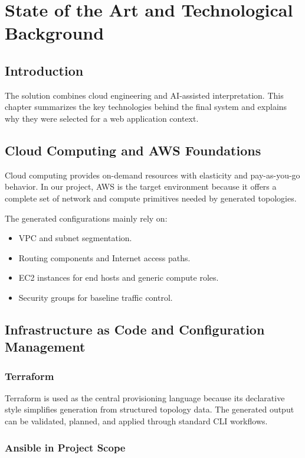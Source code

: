 \documentclass[12pt,a4paper,openany]{report}
\begin{document}
\chapter{State of the Art and Technological Background}

\section{Introduction}

The solution combines cloud engineering and AI-assisted interpretation. This chapter summarizes the key technologies behind the final system and explains why they were selected for a web application context.

\section{Cloud Computing and AWS Foundations}

Cloud computing provides on-demand resources with elasticity and pay-as-you-go behavior. In our project, AWS is the target environment because it offers a complete set of network and compute primitives needed by generated topologies.

The generated configurations mainly rely on:
\begin{itemize}
    \item VPC and subnet segmentation.
    \item Routing components and Internet access paths.
    \item EC2 instances for end hosts and generic compute roles.
    \item Security groups for baseline traffic control.
\end{itemize}

\section{Infrastructure as Code and Configuration Management}

\subsection{Terraform}

Terraform is used as the central provisioning language because its declarative style simplifies generation from structured topology data. The generated output can be validated, planned, and applied through standard CLI workflows.

\subsection{Ansible in Project Scope}
\end{document}
